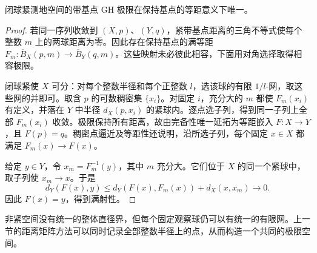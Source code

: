 \begin{proposition}\label{g3:prop:pointed-gh-unique}
	闭球紧测地空间的带基点 GH 极限在保持基点的等距意义下唯一。
\end{proposition}
\begin{proof}
	若同一序列收敛到 \((X,p)\)、\((Y,q)\)，紧带基点距离的三角不等式使每个整数 \(m\) 上的两球距离为零。因此存在保持基点的满等距
	\(F_m:\overline B_X(p,m)\to\overline B_Y(q,m)\)。这些映射未必彼此相容，下面用对角选择取得相容极限。

	闭球紧使 \(X\) 可分：对每个整数半径和每个正整数 \(l\)，选该球的有限 \(1/l\)-网，取这些网的并即可。取含 \(p\) 的可数稠密集 \(\{x_i\}\)。对固定 \(i\)，充分大的 \(m\) 都使 \(F_m(x_i)\) 有定义，并落在 \(Y\) 中半径 \(d_X(p,x_i)\) 的紧球内。逐点选子列，得到同一子列上全部 \(F_m(x_i)\) 收敛。极限保持所有距离，故由完备性唯一延拓为等距嵌入 \(F:X\to Y\)，且 \(F(p)=q\)。稠密点逼近及等距性还说明，沿所选子列，每个固定 \(x\in X\) 都满足 \(F_m(x)\to F(x)\)。

	给定 \(y\in Y\)，令 \(x_m=F_m^{-1}(y)\)，其中 \(m\) 充分大。它们位于 \(X\) 的同一个紧球中，取子列使 \(x_m\to x\)。于是
	\[
		d_Y(F(x),y)
		\le d_Y(F(x),F_m(x))+d_X(x,x_m)\longrightarrow0.
	\]
	因此 \(F(x)=y\)，得到满射性。
\end{proof}

非紧空间没有统一的整体直径界，但每个固定观察球仍可以有统一的有限网。上一节的距离矩阵方法可以同时记录全部整数半径上的点，从而构造一个共同的极限空间。

